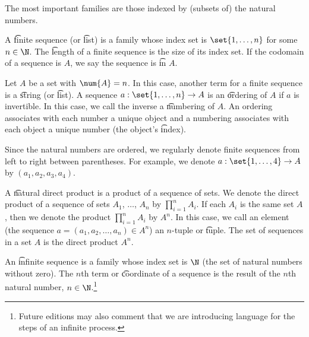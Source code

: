 

The most important families are those indexed by (subsets of) the natural numbers.


A \t{finite sequence} (or \t{list}) is a family whose index set is $\set{1, \dots, n}$ for some $n \in \N$.
The \t{length} of a finite sequence is the size of its index set.
If the codomain of a sequence is $A$, we say the sequence is \t{in} $A$.

Let $A$ be a set with $\num{A} = n$.
In this case, another term for a finite sequence is a \t{string} (or \t{list}).
A sequence $a: \set{1, \dots, n} \to A$ is an \t{ordering} of $A$ if $a$ is invertible.
In this case, we call the inverse a \t{numbering} of $A$.
An ordering associates with each number a unique object and a numbering associates with each object a unique number (the object's \t{index}).


Since the natural numbers are ordered, we regularly denote finite sequences from left to right between parentheses.
For example, we denote $a: \set{1, \dots, 4} \to A$ by $(a_1, a_2, a_3, a_4)$.


A \t{natural direct product} is a product of a sequence of sets.
We denote the direct product of a sequence of sets $A_1$, $\dots$, $A_n$ by $\prod_{i = 1}^{n} A_i$.
If each $A_i$ is the same set $A$, then we denote the product $\prod_{i = 1}^{n} A_i$ by $A^n$.
In this case, we call an element (the sequence $a = (a_1, a_2, \dots, a_n) \in A^n$) an \t{$n$-tuple} or \t{tuple}.
The set of sequences in a set $A$ is the direct product $A^n$.


An \t{infinite sequence} is a family whose index set is $\N$ (the set of natural numbers without zero).
The \t{$n$th term} or \t{coordinate} of a sequence is the result of the $n$th natural number, $n \in \N$.\footnote{Future editions may also comment that we are introducing language for the steps of an infinite process.}

